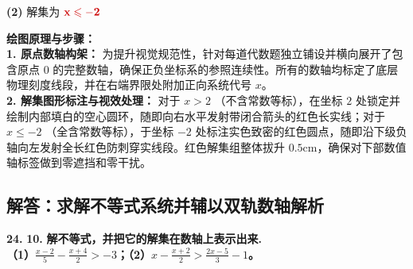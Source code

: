 \vspace{0.6cm}
\noindent \textbf{(2)} 解集为 $\textcolor{red!80!black}{\mathbf{x \leqslant -2}}$ \par\vspace{0.2cm}
\begin{center}
\end{center}

\vspace{0.4cm}
{\small\color{blue!70!black}
\textbf{绘图原理与步骤：}\\
\textbf{1. 原点数轴构架：} 为提升视觉规范性，针对每道代数题独立铺设并横向展开了包含原点 $0$ 的完整数轴，确保正负坐标系的参照连续性。所有的数轴均标定了底层物理刻度线段，并在右端界限处附加正向系统代号 $x$。\\
\textbf{2. 解集图形标注与视效处理：} 对于 $x > 2$ （不含常数等标），在坐标 $2$ 处锁定并绘制内部填白的空心圆环，随即向右水平发射带闭合箭头的红色长实线；对于 $x \leqslant -2$ （全含常数等标），于坐标 $-2$ 处标注实色致密的红色圆点，随即沿下级负轴向左发射全长红色防刺穿实线段。红色解集组整体拔升 $0.5\mathrm{cm}$，确保对下部数值轴标签做到零遮挡和零干扰。
}

\newpage

\newpage

\subsection{解答：求解不等式系统并辅以双轨数轴解析}

\vspace{0.6cm}

\textbf{\LARGE 24.} \textbf{\color{cyan!80!blue} 10. }\textbf{解不等式，并把它的解集在数轴上表示出来.\\
（1）$\frac{x-2}{5} - \frac{x+4}{2} > -3$；\hspace{2cm}（2）$x - \frac{x+2}{2} > \frac{2x-5}{3} - 1$。}

